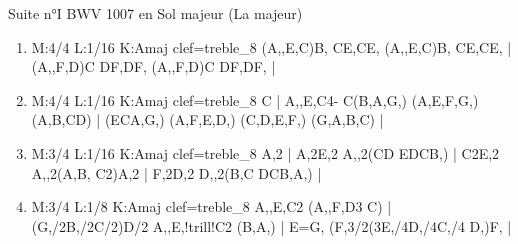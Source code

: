 \documentclass[a4paper,twoside]{article}
\begin{document}
\begin{center}
\Large Suite n°I BWV 1007 en Sol majeur (La majeur)
\end{center}

\vspace{3cm}

%
%
\large
\settowidth{\titlelen}{Allemande}
\addtolength{\titlelen}{0.5em}
\setlength{\titleseplen}{1cm}
\begin{enumerate}
  \item {}
\begin{abcsvg}
  M:4/4
  L:1/16
  K:Amaj clef=treble_8
  (A,,E,C)B, CE,CE, (A,,E,C)B, CE,CE, |
  (A,,F,D)C DF,DF, (A,,F,D)C DF,DF, |
\end{abcsvg}
\makebox[2cm][l]{ \dotfill\ \pageref{Iprelude}}
\par\vspace{\titleseplen}

  \item {}
\begin{abcsvg}
  M:4/4
  L:1/16
  K:Amaj clef=treble_8
  C |
  {A,,E,}C4- C(B,A,G,) (A,E,F,G,) (A,B,CD) |
  (ECA,G,) (A,F,E,D,) (C,D,E,F,) (G,A,B,C) |
\end{abcsvg}
\makebox[2cm][l]{ \dotfill\ \pageref{Iallemande}}
\par\vspace{\titleseplen}

  \item {}
\begin{abcsvg}
  M:3/4
  L:1/16
  K:Amaj clef=treble_8
  A,2 |
  A,2E,2 A,,2(CD EDCB,) |
  C2E,2 A,,2(A,B, C2)A,2 |
  F,2D,2 D,,2(B,C DCB,A,) |
\end{abcsvg}
\makebox[2cm][l]{ \dotfill\ \pageref{Icourante}}
\par\vspace{\titleseplen}

  \item {}
\begin{abcsvg}
  M:3/4
  L:1/8
  K:Amaj clef=treble_8
  {A,,E,}C2 ({A,,F,}D3 C) |
  (G,/2B,/2C/2)D/2 {A,,E,}!trill!C2 (B,A,) |
  E=G, (F,3/2(3E,/4D,/4C,/4 D,)F, |
\end{abcsvg}
\makebox[2cm][l]{ \dotfill\ \pageref{Isarabande}}
\par\vspace{\titleseplen}


\end{enumerate}
\end{document}
